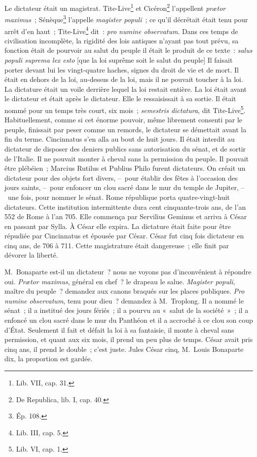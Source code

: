 \documentclass[french,twoside]{book} %
\begin{document}
Le dictateur était un magistrat. Tite-Live\footnote{Lib. VII, cap. 31.} et Cicéron\footnote{De Republica, lib. I, cap. 40.} l’appellent \emph{prætor maximus} ; Sénèque\footnote{Ép. 108.} l’appelle \emph{magister populi} ; ce qu’il décrétait était tenu pour arrêt d’en haut ; Tite-Live\footnote{Lib. III, cap. 5.} dit : \emph{pro numine observatum}. Dans ces temps de civilisation incomplète, la rigidité des lois antiques n’ayant pas tout prévu, sa fonction était de pourvoir au salut du peuple il était le produit de ce texte : \emph{salus populi suprema lex esto} [que la loi suprême soit le salut du peuple] Il faisait porter devant lui les vingt-quatre haches, signes du droit de vie et de mort. Il était en dehors de la loi, au-dessus de la loi, mais il ne pouvait toucher à la loi. La dictature était un voile derrière lequel la loi restait entière. La loi était avant le dictateur et était après le dictateur. Elle le ressaisissait à sa sortie. Il était nommé pour un temps très court, six mois ; \emph{semestris dictatura}, dit Tite-Live\footnote{Lib. VI, cap. 1.}. Habituellement, comme si cet énorme pouvoir, même librement consenti par le peuple, finissait par peser comme un remords, le dictateur se démettait avant la fin du terme. Cincinnatus s’en alla au bout de huit jours. Il était interdit au dictateur de disposer des deniers publics sans autorisation du sénat, et de sortir de l’Italie. Il ne pouvait monter à cheval sans la permission du peuple. Il pouvait être plébéien ; Marcius Rutilus et Publius Philo furent dictateurs. On créait un dictateur pour des objets fort divers, – pour établir des fêtes à l’occasion des jours saints, – pour enfoncer un clou sacré dans le mur du temple de Jupiter, – une fois, pour nommer le sénat. Rome république porta quatre-vingt-huit dictateurs. Cette institution intermittente dura cent cinquante-trois ans, de l’an 552 de Rome à l’an 705. Elle commença par Servilius Geminus et arriva à César en passant par Sylla. À César elle expira. La dictature était faite pour être répudiée par Cincinnatus et épousée par César. César fut cinq fois dictateur en cinq ans, de 706 à 711. Cette magistrature était dangereuse ; elle finit par dévorer la liberté.\par
M. Bonaparte est-il un dictateur ? nous ne voyons pas d’inconvénient à répondre oui. \emph{Prætor maximus}, général en chef ? le drapeau le salue. \emph{Magister populi}, maître du peuple ? demandez aux canons braqués sur les places publiques. \emph{Pro numine observatum}, tenu pour dieu ? demandez à M. Troplong. Il a nommé le sénat ; il a institué des jours fériés ; il a pourvu au « salut de la société » ; il a enfoncé un clou sacré dans le mur du Panthéon et il a accroché à ce clou son coup d’État. Seulement il fait et défait la loi à sa fantaisie, il monte à cheval sans permission, et quant aux six mois, il prend un peu plus de temps. César avait pris cinq ans, il prend le double ; c’est juste. Jules César cinq, M. Louis Bonaparte dix, la proportion est gardée.\par
\end{document}
